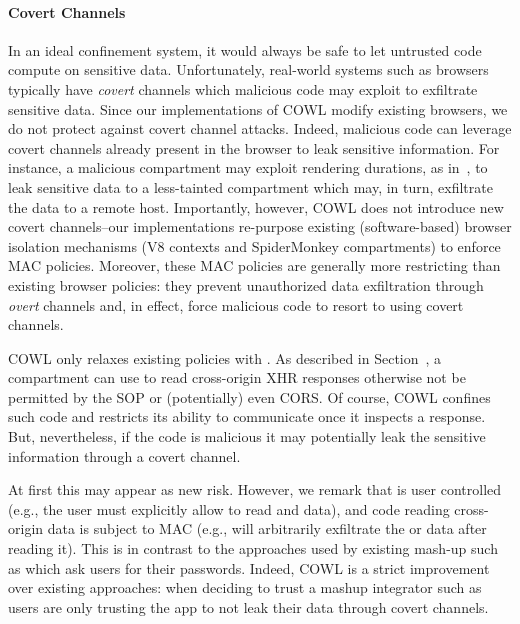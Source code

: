 \paragraph{Covert Channels}
In an ideal confinement system, it would always be safe to let untrusted
code compute on sensitive data.
%
Unfortunately, real-world systems such as browsers typically have
\emph{covert} channels which malicious code may exploit to exfiltrate
sensitive data.
%
Since our implementations of COWL modify existing browsers, we do not
protect against covert channel attacks.
%
Indeed, malicious code can leverage covert channels already present in
the browser to leak sensitive information.
%
For instance, a malicious compartment may exploit rendering durations,
as in~\tocite{}, to leak sensitive data to a less-tainted compartment
which may, in turn, exfiltrate the data to a remote host.
%
Importantly, however, COWL does not introduce new covert channels--our
implementations re-purpose existing (software-based) browser isolation
mechanisms (V8 contexts and SpiderMonkey compartments) to enforce MAC
policies.
%
Moreover, these MAC policies are generally more restricting than
existing browser policies: they prevent unauthorized data exfiltration
through \emph{overt} channels and, in effect, force malicious code to
resort to using covert channels.


COWL only relaxes existing policies with \lcors.
%
As described in Section~\toref{}, a compartment can use \lcors{} to
read cross-origin XHR responses otherwise not be permitted by the SOP
or (potentially) even CORS.
%
Of course, COWL confines such code and restricts its ability to
communicate once it inspects a response.
%
But, nevertheless, if the code is malicious it may potentially leak the
sensitive information through a covert channel.
 
At first this may appear as new risk.
%
However, we remark that \lcors{} is user controlled (e.g., the user
must explicitly allow  to read  and
 data), and code reading cross-origin data is
subject to MAC (e.g.,  will arbitrarily exfiltrate
the  or  data after reading it).
%
This is in contrast to the approaches used by existing mash-up such as
 which ask users for their passwords.
%
Indeed, COWL is a strict improvement over existing approaches: when
deciding to trust a mashup integrator such as  users
are only trusting the app to not leak their data through covert
channels.

